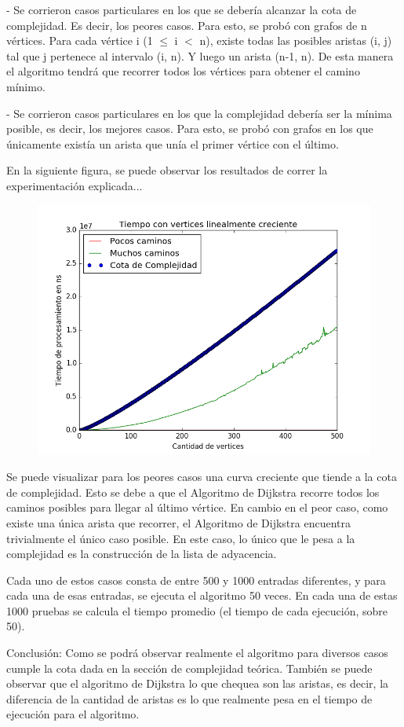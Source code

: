         \par - Se corrieron casos particulares en los que se debería alcanzar la cota de complejidad. Es decir, los peores casos.
        Para esto, se probó con grafos de n vértices. Para cada vértice i (1 $\leq$ i $<$ n), existe todas las posibles aristas (i, j) tal que j pertenece al intervalo (i, n). Y luego un arista (n-1, n). 
        De esta manera el algoritmo tendrá que recorrer todos los vértices para obtener el camino mínimo.

        \par - Se corrieron casos particulares en los que la complejidad debería ser la mínima posible, es decir, los mejores casos.
        Para esto, se probó con grafos en los que únicamente existía un arista que unía el primer vértice con el último.

        En la siguiente figura, se puede observar los resultados de correr la experimentación explicada...

        \begin{figure}[H]
          \begin{center}
            \includegraphics[width=0.7\columnwidth]{../exp/ej3tamanosFijos.png}
            \caption{}
          \end{center}
        \end{figure}

        Se puede visualizar para los peores casos una curva creciente que tiende a la cota de complejidad. Esto se debe a que el Algoritmo de Dijkstra recorre todos los caminos posibles para llegar al último vértice.
        En cambio en el peor caso, como existe una única arista que recorrer, el Algoritmo de Dijkstra encuentra trivialmente el único caso posible. En este caso, lo único que le pesa a la complejidad es la construcción de la lista de adyacencia.

        Cada uno de estos casos consta de entre 500 y 1000 entradas diferentes, y para cada una de esas entradas, se ejecuta el algoritmo 50 veces. En cada una de estas 1000 pruebas se calcula el tiempo promedio (el tiempo de cada ejecución, sobre 50).

        Conclusión: Como se podrá observar realmente el algoritmo para diversos casos cumple la cota dada en la sección de complejidad teórica. También se puede observar que el algoritmo de Dijkstra lo que chequea son las aristas, es decir, la diferencia de la cantidad de aristas es lo que realmente pesa en el tiempo de ejecución para el algoritmo.